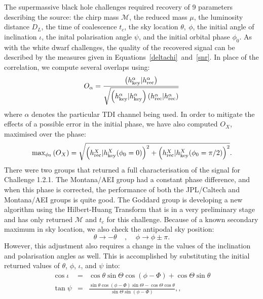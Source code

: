 \documentclass[12pt]{iopart}
\begin{document}
The supermassive black hole challenges required recovery of 9 parameters describing the source: the chirp mass $\mathcal{M}$, the reduced mass $\mu$, the luminosity distance $D_L$, the time of coalescence $t_c$, the sky location $\theta,~\phi$, the initial angle of inclination $\iota$, the inital polarisation angle $\psi$, and the initial orbital phase $\phi_0$. As with the white dwarf challenges, the quality of the recovered signal can be described by the measures given in Equations~\ref{deltachi}~and~\ref{snr}. In place of the correlation, we compute several overlaps using:
\begin{equation}
\label{overlaps}
O_{\alpha} = \frac{\left(h^{\alpha}_{\rm key}|h^{\alpha}_{\rm rec}\right)}{\sqrt{\left(h^{\alpha}_{\rm key}|h^{\alpha}_{\rm key}\right)\left(h^{\alpha}_{\rm rec}|h^{\alpha}_{\rm rec}\right)}}
\end{equation}
where $\alpha$ denotes the particular TDI channel being used. In order to mitigate the effects of a possible error in the initial phase, we have also computed $O_X$, maximised over the phase:
\begin{equation}
\label{maxphi}
{\rm max}_{\phi_0}\left(O_X\right) = \sqrt{\left(h^{X}_{\rm rec}|h^{X}_{\rm key}(\phi_0=0)\right)^2+\left(h^{X}_{\rm rec}|h^{X}_{\rm key}(\phi_0=\pi/2)\right)^2}.
\end{equation}
There were two groups that returned a full characterisation of the signal for Challenge 1.2.1. The Montana/AEI group had a constant phase difference, and when this phase is corrected, the performance of both the JPL/Caltech and Montana/AEI groups is quite good. The Goddard group is developing a new algorithm using the Hilbert-Huang Transform that is in a very preliminary stage and has only returned $\mathcal{M}$ and $t_c$ for this challenge. Because of a known secondary maximum in sky location, we also check the antipodal sky position:
\begin{equation}
\theta  \rightarrow  - \theta~~~~~,~~~~~\phi  \rightarrow  \phi \pm \pi. \label{skyflip}
\end{equation}
However, this adjustment also requires a change in the values of the inclination and polarisation angles as well. This is accomplished by substituting the initial returned values of $\theta$, $\phi$, $\iota$, and $\psi$ into:
\begin{eqnarray}
\cos{\iota} & = & \cos{\theta}\sin{\Theta}\cos{\left(\phi - \Phi\right)} + \cos{\Theta}\sin{\theta} \label{iota} \\
\tan{\psi} & = & \frac{\sin{\theta}\cos{\left(\phi - \Phi\right)}\sin{\Theta} - \cos{\Theta}\cos{\theta}}{\sin{\Theta}\sin{\left(\phi - \Phi\right)}}, \label{psi},
\end{eqnarray}
\end{document}
